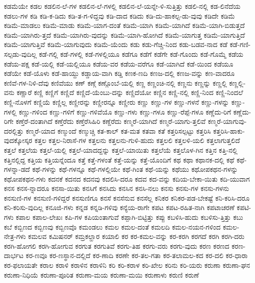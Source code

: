 {ಕಡಮೆಯೇ
ಕಡಲ
ಕಡಲಿನ-ಲೆ-ಗಳ
ಕಡಲಿನ-ಲೆ-ಗಳಲ್ಲಿ
ಕಡಲಿನ-ಲೆ-ಯನ್ನೇ-ಳಿ-ಸುತ್ತಿತ್ತು
ಕಡಲಿ-ನಲ್ಲಿ
ಕಡ-ಲಿನೆದೆಯ
ಕಡಲು-ಗಳ
ಕಡಿ
ಕಡಿ-ಕ-ಡಿದು
ಕಡಿ-ತ-ಗ-ಳಿದ್ದವು
ಕಡಿ-ದಾದ
ಕಡಿದು
ಕಡಿ-ದು-ಹಾಕಲ್ಪ-ಡು-ವುವು
ಕಡಿದೇ
ಕಡಿಮೆ
ಕಡಿಮೆ-ಮಾಡಲು
ಕಡಿಮೆ-ಮಾಡು
ಕಡಿಮೆ-ಯಾಗ-ದಂತೆ
ಕಡಿಮೆ-ಯಾಗಿ
ಕಡಿಮೆ-ಯಾಗಿದೆ
ಕಡಿಮೆ-ಯಾಗಿ-ಬಿಡುತ್ತದೆ
ಕಡಿಮೆ-ಯಾಗಿರು-ತ್ತದೆ
ಕಡಿಮೆ-ಯಾಗಿರು-ವುದನ್ನು
ಕಡಿಮೆ-ಯಾಗಿ-ಹೋಗಿದೆ
ಕಡಿಮೆ-ಯಾಗುತ್ತ
ಕಡಿಮೆ-ಯಾಗುತ್ತಿದೆ
ಕಡಿಮೆ-ಯಾಗುತ್ತಿವೆ
ಕಡಿಮೆ-ಯಾಗುವುದು
ಕಡಿಮೆ-ಯೆಂದು
ಕಡು
ಕಡು-ಗೆಚ್ಚಿ-ನಿಂದ
ಕಡು-ಬಡವ-ನಾದ
ಕಡೆ
ಕಡೆ-ಗಣಿ-ಸಲ್ಪಡು-ವುದಿಲ್ಲ
ಕಡೆ-ಗಲ್ಲಿ
ಕಡೆ-ಗಳಲ್ಲಿ
ಕಡೆ-ಗಳಲ್ಲಿಯೂ
ಕಡೆಗೂ
ಕಡೆಗೆ
ಕಡೆಗೇ
ಕಡೆ-ಗೊಂದು
ಕಡೆ-ಗೊಮ್ಮೆ
ಕಡೆಯ
ಕಡೆಯ-ಪಕ್ಷ
ಕಡೆ-ಯಲ್ಲಿ
ಕಡೆ-ಯಲ್ಲಿಯೂ
ಕಡೆಯ-ವರ
ಕಡೆಯ-ವರೆಗೂ
ಕಡೆ-ಯಾಗಿದೆ
ಕಡೆ-ಯಿಂದ
ಕಡೆಯೂ
ಕಡೆಯೇ
ಕಡೆ-ಯೊಳು
ಕಡೆ-ಹಾಯ್ದು
ಕಡ್ಡಾಯ-ವಾಗಿ
ಕಡ್ಡಿ
ಕಣಕ-ಣದಿ
ಕಣಜ-ದಲ್ಲಿ
ಕಣಜ-ವನ್ನು
ಕಣ-ವಾದರೂ
ಕಣಿವೆ-ಗಳ-ನಿಳಿ-ದೆವು
ಕಣಿವೆಯು
ಕಣ್
ಕಣ್ಗೆ
ಕಣ್ಗೊಂಬೆ-ಯಲ್ಲಿ
ಕಣ್ಣ
ಕಣ್ಣಂಚಿ-ನಲ್ಲಿ
ಕಣ್ಣನು
ಕಣ್ಣನ್ನು
ಕಣ್ಣಲ್ಲಿ
ಕಣ್ಣಲ್ಲಿ-ವನು
ಕಣ್ಣಾರೆ
ಕಣ್ಣಿ
ಕಣ್ಣಿಗೆ
ಕಣ್ಣಿದೆ
ಕಣ್ಣಿದೆ-ಯೆಂಬು-ದನ್ನು
ಕಣ್ಣಿದೆಯೋ
ಕಣ್ಣಿನ
ಕಣ್ಣಿ-ನಲ್ಲಿ
ಕಣ್ಣಿ-ನಿಂದ
ಕಣ್ಣಿ-ನಿಂದಲೆ
ಕಣ್ಣಿ-ನೊಳಗೆ
ಕಣ್ಣಿಯೆ
ಕಣ್ಣಿಲ್ಲ
ಕಣ್ಣೀರನ್ನು
ಕಣ್ಣೀರನ್ನೂ
ಕಣ್ಣೀರು
ಕಣ್ಣು
ಕಣ್ಣು-ಗಳ
ಕಣ್ಣು-ಗಳನೆ
ಕಣ್ಣು-ಗಳನ್ನು
ಕಣ್ಣು-ಗಳಲ್ಲಿ
ಕಣ್ಣು-ಗಳಿಂದ
ಕಣ್ಣು-ಗಳಿಗೆ
ಕಣ್ಣು-ಗಳಿವೆಯೊ
ಕಣ್ಣು-ಗಳು
ಕಣ್ಣು-ಗಳೂ
ಕಣ್ಣು-ರೆಪ್ಪೆ-ಗಳೂ
ಕಣ್ಣೆದು-ರಿಗೆ
ಕಣ್ಣೆದು-ರಿಗೇ
ಕಣ್ತೆರೆ-ದಂತಾಗಿದೆ
ಕಣ್ತೆರೆದು
ಕಣ್ತೆರೆಸಿಹಿರಿ
ಕಣ್ದೆರೆದು
ಕಣ್ಮರೆ-ಯಾಗಿದೆ
ಕಣ್ಮರೆ-ಯಾಗು-ತ್ತಲಿವೆ
ಕಣ್ಮರೆ-ಯಾಗುವು-ದರಲ್ಲಿತ್ತು
ಕಣ್ಮರೆ-ಯಾದ
ಕಣ್ಮುಂದೆ
ಕಣ್ಮುಚ್ಚಿ
ಕತ-ಕಾಲ್
ಕತ-ಮತ
ಕತವಾ
ಕತೆ
ಕತ್ತರಿಸಲ್ಪಟ್ಟು
ಕತ್ತರಿಸಿ
ಕತ್ತರಿಸಿ-ಹಾಕು-ವುದಕ್ಕೋಸ್ಕರ
ಕತ್ತಲ
ಕತ್ತಲ-ನಿರಾಸೆ-ಗಳ
ಕತ್ತಲನು
ಕತ್ತಲನು-ಗುಳಿ-ಹುದು
ಕತ್ತಲಲಿ
ಕತ್ತಲಳಿ-ಯಲಿ
ಕತ್ತಲಾಗುತ್ತಲಿದೆ
ಕತ್ತಲೆ
ಕತ್ತಲೆಯ
ಕತ್ತಲೆ-ಯಲ್ಲಿ
ಕತ್ತಲೆ-ಯಾದದ್ದನ್ನು
ಕತ್ತಲೆ-ಯಾಯಿತು
ಕತ್ತಲೆಯೆ
ಕತ್ತಲೊಳ-ಗಿನ
ಕತ್ತಿನ
ಕತ್ತಿ-ನಲ್ಲಿ
ಕತ್ತಿನಲ್ಲಿದ್ದ
ಕತ್ತಿಯ
ಕತ್ತಿಯನ್ನೆಂದೂ
ಕತ್ತೆ
ಕತ್ತೆ-ಗಳಂತೆ
ಕತ್ತೆ-ಯನ್ನು
ಕತ್ತೆ-ಯೊಂದಿಗೆ
ಕಥ
ಕಥಾ
ಕಥಾನಕ-ದಲ್ಲಿ
ಕಥೆ
ಕಥೆ-ಗಳನ್ನಾ-ಡದೆ
ಕಥೆ-ಗಳನ್ನು
ಕಥೆ-ಗಳನ್ನೂ
ಕಥೆ-ಗಳಲ್ಲಿಯೇ
ಕಥೆ-ಗಿಂತ
ಕಥೆ-ಯನ್ನು
ಕಥೆಯು
ಕಥೋಪಕಥನ-ಗಳನ್ನು
ಕಥೋಪಕಥನ-ಗಳು
ಕದನಕೆ
ಕದನದ
ಕದನವು
ಕದಲಿಸಿ-ದರೂ
ಕದವ
ಕದ-ವನ್ನು
ಕದಿಯ-ಬೇಕಾ-ಯಿತು
ಕದಿ-ಯುವಾಗ
ಕನಸ
ಕನಸ-ನ್ನಾದರೂ
ಕನಸಾ-ಯಿತು
ಕನಸಿಗೆ
ಕನಸಿದು
ಕನಸಿನ
ಕನಸಿ-ನಲು
ಕನಸು
ಕನಸು-ಗಳ
ಕನಸು-ಗಳನು
ಕನಸುಣಿ-ಗಳ
ಕನಸುಣಿ-ಗಳಿದ್ದರೆ
ಕನಸುಣಿಗೂ
ಕನಸೆ
ಕನಸೆನುವ
ಕನಸೆಲ್ಲ
ಕನಿಕರ
ಕನಿಕರ-ಪಡ-ಬೇಕಷ್ಟೆ
ಕನಿ-ಕರಿಸಿ-ದರೂ
ಕನಿ-ಕರಿಸು-ವುದಿಲ್ಲ
ಕನೂಜಿ-ಗಳು
ಕನ್ನಡ
ಕನ್ನಡಿ-ಗಳಿವು
ಕನ್ಯೆಯ-ರಾಗೇ
ಕಪಟ
ಕಪಟ-ರಹಿತ-ನಾಗಿ
ಕಪಟಾಚರಣೆ
ಕಪಟಿ-ಗಳು
ಕಪಾಲ
ಕಪಾಲ-ಲೇಖಃ
ಕಪಿ-ಗಳ
ಕಪಿಯಂತಾಗುವೆ
ಕಪ್ಪಾಗಿ-ಬಿಟ್ಟಿತ್ತು
ಕಪ್ಪು
ಕಬಳಿಸಿ-ಹುದು
ಕಬಳಿಸು-ತ್ತಿತ್ತು
ಕಬು
ಕಬೆ
ಕಬ್ಬಿಣದ
ಕಬ್ಬಿಣವು
ಕಬ್ಬಿಣವೊ
ಕಮಂಡಲು
ಕಮಲ
ಕಮಲ-ದಂತೆ
ಕಮಲದಿ
ಕಮಲ-ನಯನ-ಗಳಿಂದ
ಕಮಲ-ನೇತ್ರ-ಗಳು
ಕಮಲವ
ಕಮಿಷನರ್
ಕಮ್ರಕಲ್ಹಾರ
ಕಯಾಲಿ
ಕರ
ಕರ-ಕಮಲ-ವನ್ನು
ಕರ-ಕರಗಿ
ಕರಗದೆ
ಕರಗಿ
ಕರಗಿ-ದರು
ಕರಗಿ-ಹೋಗಲಿ
ಕರಗಿ-ಹೋಗುವ
ಕರಗುತ
ಕರಗುತಿವೆ
ಕರಗು-ತಿಹ
ಕರಗು-ವರು
ಕರಗು-ವುದು
ಕರಣ
ಕರಣದ
ಕರಣ-ದಾರ್ಭಟ
ಕರ-ಣವೂ
ಕರ-ಣಸ್ಥಾನ-ದಲ್ಲಿದೆ
ಕರ-ಣಾದಿ
ಕರಣೇ
ಕರ-ತಲ-ಗತಾ
ಕರ-ತಲಾಮಲ-ಕದ
ಕರ-ದಲಿ
ಕರ-ಧಾರಾ
ಕರ-ಫಲಾಯತೇ
ಕರಾಲ
ಕರಾಳಿ
ಕರಾಳಿನ
ಕರಾಳಿನಿ
ಕರಿ
ಕರಿ-ಕರಾಳ
ಕರಿ-ಖೇಲ
ಕರಿನು
ಕರಿ-ಯರು
ಕರುಣಾ
ಕರುಣಾ-ಘನ
ಕರುಣಾ-ನಿಧಿಯೆ
ಕರುಣಾ-ಪೂರಿತ
ಕರುಣಾ-ಮಯ
ಕರುಣಾ-ಮಯಿ
ಕರುಣಾಳು
ಕರುಣಿ
ಕರುಣೆ
}
